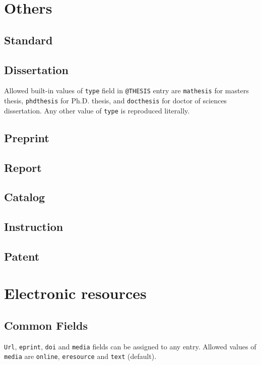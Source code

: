 \documentclass[a4paper]{article}
\begin{document}
\section{Others}

\subsection{Standard}

\subsection{Dissertation}
Allowed built-in values of \verb|type| field in \verb|@THESIS| entry are \verb|mathesis| for masters thesis, \verb|phdthesis| for Ph.D. thesis, and \verb|docthesis| for doctor of sciences dissertation. Any other value of \verb|type| is reproduced literally.

\subsection{Preprint}

\subsection{Report}

\subsection{Catalog}

\subsection{Instruction}

\subsection{Patent}


\section{Electronic resources}

\subsection{Common Fields}
\verb|Url|, \verb|eprint|, \verb|doi| and \verb|media| fields can be assigned to any entry. Allowed values of \verb|media| are \verb|online|, \verb|eresource| and \verb|text| (default).
\end{document}
